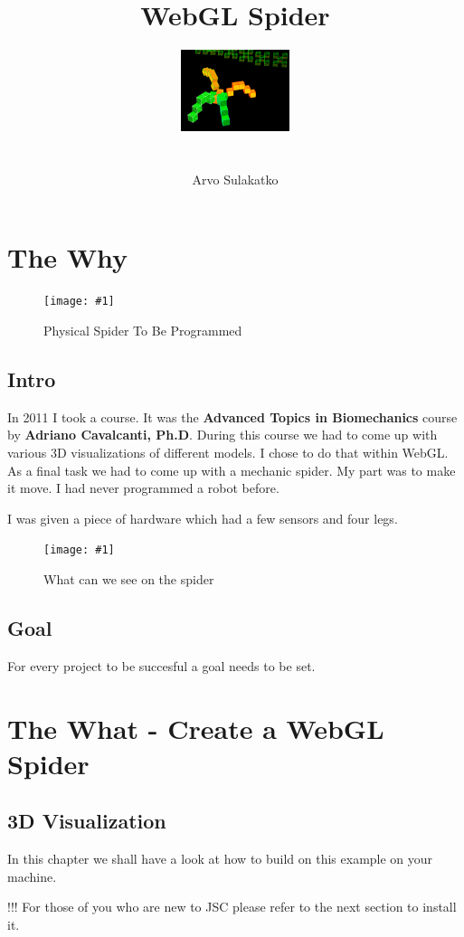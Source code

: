 \documentclass[12pt,leqno]{book}
\title{WebGL Spider}
\author{\includegraphics{../Design/Preview.png} \\ \\ \\ Arvo Sulakatko }
\newcommand{\png}[1]{\texttt{[image: \#1]}}
\newcommand{\figpng}[2]{\begin{figure}[htb]\centering\png{#1}\caption{#2}\end{figure}}
\begin{document}
\maketitle



\tableofcontents
\listoffigures


\chapter{The Why}

\figpng{Images/www.youtube.comvhKksAVmekAE_-_Google_Chrome-2012-03-14_16.27.22}
{Physical Spider To Be Programmed}




\section{Intro}

In 2011 I took a course. It was the \textbf{Advanced Topics in Biomechanics} course by \textbf{Adriano Cavalcanti, Ph.D}. During this course we had to come up with various 3D visualizations of different models. I chose to do that within WebGL. As a final task we had to come up with a mechanic spider. My part was to make it move. I had never programmed a robot before. 

I was given a piece of hardware which had a few sensors and four legs.

\figpng{Images/parts}
{What can we see on the spider}

\section{Goal}
For every project to be succesful a goal needs to be set.


\chapter{The What - Create a WebGL Spider}
\section{3D Visualization}
In this chapter we shall have a look at how to build on this example on your machine.

\begin{framed}
!!! For those of you who are new to JSC please refer to the next section to install it.
\end{framed}
\end{document}
